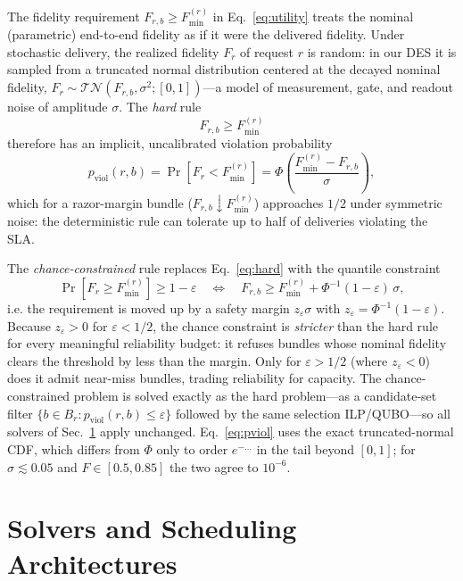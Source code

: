 \documentclass[twocolumn]{article}
\begin{document}
The fidelity requirement $F_{r,b} \ge F_{\min}^{(r)}$ in
Eq.~\eqref{eq:utility} treats the nominal (parametric) end-to-end
fidelity as if it were the delivered fidelity.  Under stochastic
delivery, the realized fidelity $F_r$ of request $r$ is random: in our
DES it is sampled from a truncated normal distribution centered at the
decayed nominal fidelity,
$F_r \sim \mathcal{TN}(F_{r,b}, \sigma^2; [0,1])$---a model of
measurement, gate, and readout noise of amplitude $\sigma$.  The
\emph{hard} rule
\begin{equation}
  \label{eq:hard}
  F_{r,b} \ge F_{\min}^{(r)}
\end{equation}
therefore has an implicit, uncalibrated violation probability
\begin{equation}
  \label{eq:pviol}
  p_{\text{viol}}(r,b) = \Pr[F_r < F_{\min}^{(r)}]
    = \Phi\!\left(\frac{F_{\min}^{(r)} - F_{r,b}}{\sigma}\right),
\end{equation}
which for a razor-margin bundle ($F_{r,b} \downarrow F_{\min}^{(r)}$)
approaches $1/2$ under symmetric noise: the deterministic rule can
tolerate up to half of deliveries violating the SLA.

The \emph{chance-constrained} rule replaces Eq.~\eqref{eq:hard} with
the quantile constraint
\begin{equation}
  \label{eq:chance}
  \Pr[F_r \ge F_{\min}^{(r)}] \ge 1-\varepsilon
  \quad\Longleftrightarrow\quad
  F_{r,b} \ge F_{\min}^{(r)} + \Phi^{-1}(1-\varepsilon)\, \sigma,
\end{equation}
i.e. the requirement is moved up by a safety margin $z_{\varepsilon}
\sigma$ with $z_{\varepsilon} = \Phi^{-1}(1-\varepsilon)$.  Because
$z_{\varepsilon} > 0$ for $\varepsilon < 1/2$, the chance constraint
is \emph{stricter} than the hard rule for every meaningful reliability
budget: it refuses bundles whose nominal fidelity clears the
threshold by less than the margin.  Only for $\varepsilon > 1/2$
(where $z_{\varepsilon} < 0$) does it admit near-miss bundles, trading
reliability for capacity.  The chance-constrained problem is solved
exactly as the hard problem---as a candidate-set filter
$\{b \in B_r : p_{\text{viol}}(r,b) \le \varepsilon\}$ followed by the
same selection ILP/QUBO---so all solvers of Sec.~\ref{sec:solvers}
apply unchanged.  Eq.~\eqref{eq:pviol} uses the exact truncated-normal
CDF, which differs from $\Phi$ only to order $e^{-\dots}$ in the tail
beyond $[0,1]$; for $\sigma \lesssim 0.05$ and $F \in [0.5,0.85]$ the
two agree to $10^{-6}$.

\section{Solvers and Scheduling Architectures}
\label{sec:solvers}
\end{document}
